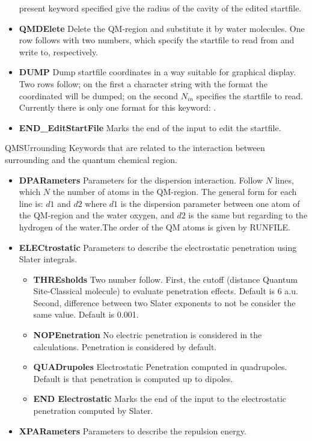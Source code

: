 \begin{keywordlist}
\begin{itemize}
present keyword specified give the radius of the cavity of
the edited startfile.
\item {\bf QMDElete} Delete the QM-region and substitute it by water molecules.
One row follows with two numbers, which specify the startfile to read from and write to, respectively.
\item {\bf DUMP} Dump startfile coordinates in a way suitable for graphical display.
Two rows follow; on the first a character string with the format the coordinated
will be dumped; on the second $N_{in}$ specifies the startfile to read.
Currently there is only one format for this keyword: .
\item {\bf END\_EditStartFile} Marks the end of the input to edit the startfile.
\end{itemize}
\item[QMSUrrounding]
Keywords that are related to the interaction between surrounding
and the quantum chemical region.
\begin{itemize}
\item {\bf DPARameters}
Parameters for the dispersion interaction.
Follow $N$ lines, which $N$ the number of atoms in the QM-region. The general form for each line is: $d1$ and $d2$ where $d1$ is the dispersion parameter between one atom of the QM-region and the water oxygen, and $d2$ is the same but regarding to the hydrogen of the water.The order of the QM atoms is given by RUNFILE.
\item {\bf ELECtrostatic}
Parameters to describe the electrostatic penetration using Slater integrals.
\begin{itemize}
\item {\bf THREsholds}
Two number follow. First, the cutoff (distance Quantum Site-Classical molecule) to evaluate penetration effects. Default is 6 a.u.
Second, difference between two Slater exponents to not be consider the same value. Default is 0.001.
\item {\bf NOPEnetration}
No electric penetration is considered in the calculations. Penetration is considered by default.
\item {\bf QUADrupoles}
Electrostatic Penetration computed in quadrupoles. Default is that penetration is computed up to dipoles.
\item {\bf END Electrostatic}
Marks the end of the input to the electrostatic penetration computed by Slater.
\end{itemize}
\item {\bf XPARameters}
Parameters to describe the repulsion energy.

\end{itemize}
\end{keywordlist}
